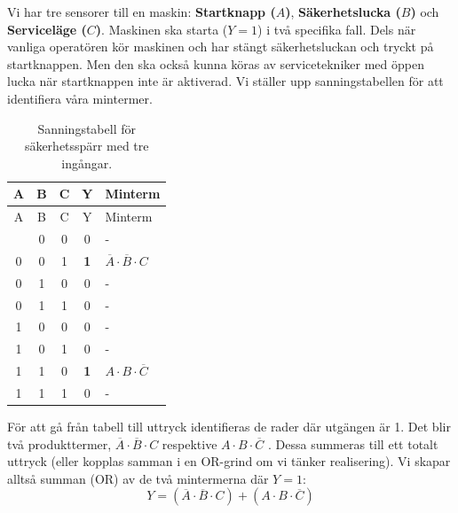 \documentclass[
  swedish,
  letterpaper,
  oneside,
  openany]{book}
\begin{document}
\begin{tcolorbox}[enhanced jigsaw, arc=.35mm, bottomrule=.15mm, bottomtitle=1mm, breakable, colback=white, colbacktitle=quarto-callout-note-color!10!white, colframe=quarto-callout-note-color-frame, coltitle=black, left=2mm, leftrule=.75mm, opacityback=0, opacitybacktitle=0.6, rightrule=.15mm, title=\textcolor{quarto-callout-note-color}{\faInfo}\hspace{0.5em}{Exempel: Säkerhetsspärr med tre insignaler}, titlerule=0mm, toprule=.15mm, toptitle=1mm]

Vi har tre sensorer till en maskin: \textbf{Startknapp (\(A\))},
\textbf{Säkerhetslucka (\(B\))} och \textbf{Serviceläge (\(C\))}.
Maskinen ska starta (\(Y=1\)) i två specifika fall. Dels när vanliga
operatören kör maskinen och har stängt säkerhetsluckan och tryckt på
startknappen. Men den ska också kunna köras av servicetekniker med öppen
lucka när startknappen inte är aktiverad. Vi ställer upp
sanningstabellen för att identifiera våra mintermer.

\begin{longtable}[]{@{}ccccl@{}}
\caption{Sanningstabell för säkerhetsspärr med tre
ingångar.}\label{tbl-tt-safety-circuit}\tabularnewline
\toprule\noalign{}
A & B & C & Y & Minterm \\
\midrule\noalign{}
\endfirsthead
\toprule\noalign{}
A & B & C & Y & Minterm \\
\midrule\noalign{}
\endhead
\bottomrule\noalign{}
\endlastfoot
0 & 0 & 0 & 0 & - \\
0 & 0 & 1 & \textbf{1} & \(\overline{A} \cdot \overline{B} \cdot C\) \\
0 & 1 & 0 & 0 & - \\
0 & 1 & 1 & 0 & - \\
1 & 0 & 0 & 0 & - \\
1 & 0 & 1 & 0 & - \\
1 & 1 & 0 & \textbf{1} & \(A \cdot B \cdot \overline{C}\) \\
1 & 1 & 1 & 0 & - \\
\end{longtable}

För att gå från tabell till uttryck identifieras de rader där utgängen
är 1. Det blir två produkttermer,
\(\overline{A} \cdot \overline{B} \cdot C\) \textbar{} respektive
\(A \cdot B \cdot \overline{C}\) \textbar. Dessa summeras till ett
totalt uttryck (eller kopplas samman i en OR-grind om vi tänker
realisering). Vi skapar alltså summan (OR) av de två mintermerna där
\(Y=1\):
\[Y = (\overline{A} \cdot \overline{B} \cdot C) + (A \cdot B \cdot \overline{C})\]

\end{tcolorbox}
\end{document}
